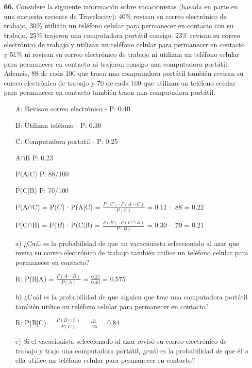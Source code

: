 \documentclass[12pt, letterpaper, spanish]{article}
\begin{document}
\textbf{66.} Considere la siguiente información sobre vacacionistas (basada en parte en una encuesta reciente de Travelocity): 40\% revisan su correo electrónico de trabajo, 30\% utilizan un teléfono celular para permanecer en contacto con su trabajo, 25\% trajeron una computadora portátil consigo, 23\% revisan su correo electrónico de trabajo y utilizan un teléfono celular para permanecer en contacto y 51\% ni revisan su correo electrónico de trabajo ni utilizan un teléfono celular para permanecer en contacto ni trajeron consigo una computadora portátil. Además, 88 de cada 100 que traen una computadora portátil también revisan su correo electrónico de trabajo y 70 de cada 100 que utilizan un teléfono celular para permanecer en contacto también traen una computadora portátil.

\begin{itemize}
    \item[A:] Revisan correo electrónico - P: 0.40
    \item[B:] Utilizan tel\'efono - P: 0.30
    \item[C:] Computadora portatil - P: 0.25
    \item[A$\cap$B] P: 0.23
    \item[P(A|C)] P: 88/100
    \item[P(C|B)] P: 70/100
    \item[P(A$\cap$C)] = P($C$) $\cdot$ P(A|C) = $\displaystyle\frac{P(C)\cdot P(A \cap C)}{P(C)}$ =  0.11 $\cdot$ .88 = 0.22
    \item[P(C$\cap$B)] = P($B$) $\cdot$ P(C|B) = $\displaystyle\frac{P(B)\cdot P(C \cap B)}{P(B)}$ =  0.30 $\cdot$ .70 = 0.21
    \item[a)] ¿Cuál es la probabilidad de que un vacacionista seleccionado al azar que revisa su correo electrónico de trabajo también utilice un teléfono celular para permanecer en contacto?
    \item[R:]  P(B|A) = $\displaystyle\frac{P(A\cap B)}{P(A)}$ = $\displaystyle\frac{0.23}{0.40}$ = 0.575
    \item[b)] ¿Cuál es la probabilidad de que alguien que trae una computadora portátil también utilice un teléfono celular para permanecer en contacto?
    \item[R:] P(B|C) = $\displaystyle\frac{P(B\cap C)}{P(C)}$ = $\displaystyle\frac{.21}{.25}$ = 0.84
    \item[c)] Si el vacacionista seleccionado al azar revisó su correo electrónico de trabajo y trajo una computadora portátil, ¿cuál es la probabilidad de que él o ella utilice un teléfono celular para permanecer en contacto?
\end{itemize}
\end{document}
